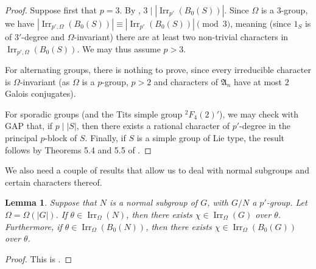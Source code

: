 \documentclass[12pt]{amsart}
\theoremstyle{theorem}
\newtheorem{lem}[teo]{Lemma}
\theoremstyle{definition}
\newcommand{\fA} {\mathfrak A}
\newcommand{\Irr}{{\operatorname{Irr}}}
\begin{document}
	\begin{proof}
		Suppose first that $p = 3$. By \cite[Corollary 1.6]{Landrock}, $3 \mid |\Irr_{p'}(B_0(S))|$. Since $\Omega$ is a $3$-group, we have $|\Irr_{p', \Omega}(B_0(S))| \equiv |\Irr_{p'}(B_0(S))| \pmod{3}$, meaning (since $1_S$ is of $3'$-degree and $\Omega$-invariant) there are at least two non-trivial characters in $\Irr_{p', \Omega}(B_0(S))$. We may thus assume $p > 3$.
		
		For alternating groups, there is nothing to prove, since every irreducible character is $\Omega$-invariant (as $\Omega$ is a $p$-group, $p > 2$ and characters of $\fA_n$ have at most $2$ Galois conjugates).
		
		For sporadic groups (and the Tits simple group $^2F_4(2)'$), we may check with GAP \cite{gap} that, if $p \mid |S|$, then there exists a rational character of $p'$-degree in the principal $p$-block of $S$. Finally, if $S$ is a simple group of Lie type, the result follows by Theorems 5.4 and 5.5 of \cite{NTV}.
	\end{proof}
	
	We also need a couple of results that allow us to deal with normal subgroups and certain characters thereof. 
	
	\begin{lem}
		\label{3.2BHZG}
		Suppose that $N$ is a normal subgroup of $G$, with $G/N$ a $p'$-group. Let $\Omega = \Omega(|G|)$. If
		$\theta \in \Irr_{\Omega}(N)$, then there exists $\chi \in \Irr_{\Omega}(G)$ over $\theta$. Furthermore, if $\theta \in \Irr_{\Omega}(B_0(N))$, then there exists $\chi \in \Irr_{\Omega}(B_0(G))$ over $\theta$.
	\end{lem}
	\begin{proof}
		This is \cite[Lemma 3.2]{MMRSF}.
	\end{proof}
	
\end{document}
